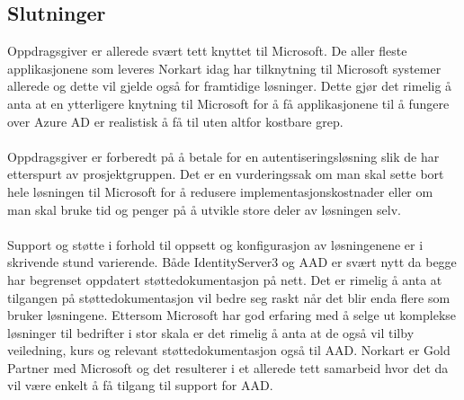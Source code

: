 \subsection*{Slutninger}
Oppdragsgiver er allerede svært tett knyttet til Microsoft. De aller fleste applikasjonene som leveres Norkart idag har tilknytning til Microsoft systemer allerede og dette vil gjelde også for framtidige løsninger. Dette gjør det rimelig å anta at en ytterligere knytning til Microsoft for å få applikasjonene til å fungere over Azure AD er realistisk å få til uten altfor kostbare grep.
\\
\\
Oppdragsgiver er forberedt på å betale for en autentiseringsløsning slik de har etterspurt av prosjektgruppen. Det er en vurderingssak om man skal sette bort hele løsningen til Microsoft for å redusere implementasjonskostnader eller om man skal bruke tid og penger på å utvikle store deler av løsningen selv. 
\\
\\
Support og støtte i forhold til oppsett og konfigurasjon av løsningenene er i skrivende stund varierende. Både IdentityServer3 og AAD er svært nytt da begge har begrenset oppdatert støttedokumentasjon på nett. Det er rimelig å anta at tilgangen på støttedokumentasjon vil bedre seg raskt når det blir enda flere som bruker løsningene. Ettersom Microsoft har god erfaring med å selge ut komplekse løsninger til bedrifter i stor skala er det rimelig å anta at de også vil tilby veiledning, kurs og relevant støttedokumentasjon også til AAD. Norkart er Gold Partner med Microsoft og det resulterer i et allerede tett samarbeid hvor det da vil være enkelt å få tilgang til support for AAD.

